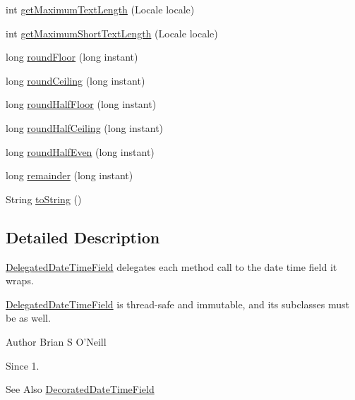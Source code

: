 \begin{DoxyCompactItemize}
\item 
int \hyperlink{classorg_1_1joda_1_1time_1_1field_1_1_delegated_date_time_field_a7c1eec2fa88d49f373de4e104ce3ea84}{get\-Maximum\-Text\-Length} (Locale locale)
\item 
int \hyperlink{classorg_1_1joda_1_1time_1_1field_1_1_delegated_date_time_field_a7a592e1f50066b5ddfad960762f6df67}{get\-Maximum\-Short\-Text\-Length} (Locale locale)
\item 
long \hyperlink{classorg_1_1joda_1_1time_1_1field_1_1_delegated_date_time_field_a8f5f4ba3cf2a25d6ee8b76d3cb8adec6}{round\-Floor} (long instant)
\item 
long \hyperlink{classorg_1_1joda_1_1time_1_1field_1_1_delegated_date_time_field_ab1db817d3e0e15186f3462a62257f6d5}{round\-Ceiling} (long instant)
\item 
long \hyperlink{classorg_1_1joda_1_1time_1_1field_1_1_delegated_date_time_field_a41cdac03b578f6fdcb65a428b365a8f7}{round\-Half\-Floor} (long instant)
\item 
long \hyperlink{classorg_1_1joda_1_1time_1_1field_1_1_delegated_date_time_field_a51e971b4eafee050333c27abf6d65b9f}{round\-Half\-Ceiling} (long instant)
\item 
long \hyperlink{classorg_1_1joda_1_1time_1_1field_1_1_delegated_date_time_field_a1bf4ad384909d75d436967235dafc790}{round\-Half\-Even} (long instant)
\item 
long \hyperlink{classorg_1_1joda_1_1time_1_1field_1_1_delegated_date_time_field_ae92e12bbf2a608558bbc02e98e4d8de4}{remainder} (long instant)
\item 
String \hyperlink{classorg_1_1joda_1_1time_1_1field_1_1_delegated_date_time_field_ad7122173991dffa9cdd9a5421d7b1e64}{to\-String} ()
\end{DoxyCompactItemize}


\subsection{Detailed Description}
{\ttfamily \hyperlink{classorg_1_1joda_1_1time_1_1field_1_1_delegated_date_time_field}{Delegated\-Date\-Time\-Field}} delegates each method call to the date time field it wraps. 

\hyperlink{classorg_1_1joda_1_1time_1_1field_1_1_delegated_date_time_field}{Delegated\-Date\-Time\-Field} is thread-\/safe and immutable, and its subclasses must be as well.

\begin{DoxyAuthor}{Author}
Brian S O'Neill 
\end{DoxyAuthor}
\begin{DoxySince}{Since}
1. 
\end{DoxySince}
\begin{DoxySeeAlso}{See Also}
\hyperlink{classorg_1_1joda_1_1time_1_1field_1_1_decorated_date_time_field}{Decorated\-Date\-Time\-Field} 
\end{DoxySeeAlso}



